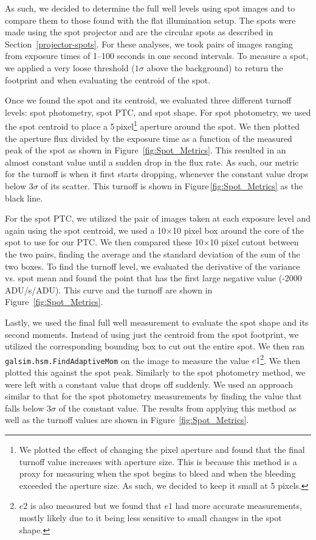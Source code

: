 As such, we decided to determine the full well levels using spot images and to compare them to those found with the flat illumination setup. The spots were made using the spot projector and are the circular spots as described in Section~\ref{projector-spots}. For these analyses, we took pairs of images ranging from exposure times of 1--100 seconds in one second intervals. To measure a spot, we applied a very loose threshold ($1\sigma$ above the background) to return the footprint and when evaluating the centroid of the spot.

Once we found the spot and its centroid, we evaluated three different turnoff levels: spot photometry, spot PTC, and spot shape.
For spot photometry, we used the spot centroid to place a 5\,pixel\footnote{We plotted the effect of changing the pixel aperture and found that the final turnoff value increases with aperture size. This is because this method is a proxy for measuring when the spot begins to bleed and when the bleeding exceeded the aperture size. As such, we decided to keep it small at 5 pixels.} aperture around the spot. We then plotted the aperture flux divided by the exposure time as a function of the measured peak of the spot as shown in Figure~\ref{fig:Spot_Metrics}. This resulted in an almost constant value until a sudden drop in the flux rate. As such, our metric for the turnoff is when it first starts dropping, whenever the constant value drops below $3\sigma$ of its scatter. This turnoff is shown in Figure\,\ref{fig:Spot_Metrics} as the black line.

For the spot PTC, we utilized the pair of images taken at each exposure level and again using the spot centroid, we used a 10$\times$10 pixel box around the core of the spot to use for our PTC. We then compared these 10$\times$10 pixel cutout between the two pairs, finding the average and the standard deviation of the sum of the two boxes. To find the turnoff level, we evaluated the derivative of the variance vs. spot mean and found the point that has the first large negative value (-2000 ADU/s/ADU). This curve and the turnoff are shown in Figure~\ref{fig:Spot_Metrics}.

Lastly, we used the final full well measurement to evaluate the spot shape and its second moments. Instead of using just the centroid from the spot footprint, we utilized the corresponding bounding box to cut out the entire spot. We then ran \texttt{galsim.hsm.FindAdaptiveMom} on the image to measure the value $e1$\footnote{$e2$ is also measured but we found that $e1$ had more accurate measurements, mostly likely due to it being less sensitive to small changes in the spot shape.}. We then plotted this against the spot peak. Similarly to the spot photometry method, we were left with a constant value that drops off suddenly. We used an approach similar to that for the spot photometry measurements by finding the value that falls below $3\sigma$ of the constant value. The results from applying this method as well as the turnoff values are shown in Figure~\ref{fig:Spot_Metrics}.

